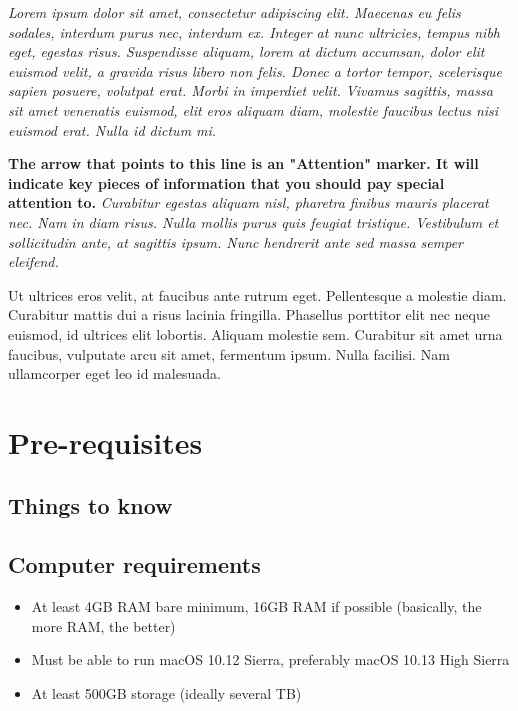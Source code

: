 \textit{Lorem ipsum dolor sit amet, consectetur adipiscing elit. Maecenas eu felis sodales, interdum purus nec, interdum ex. Integer at nunc  ultricies, tempus nibh eget, egestas risus. Suspendisse aliquam, lorem at dictum accumsan, dolor elit euismod velit, a gravida risus libero non felis. Donec a tortor tempor, scelerisque sapien posuere, volutpat erat. Morbi in imperdiet velit. Vivamus sagittis, massa sit amet venenatis euismod, elit eros aliquam diam, molestie faucibus lectus nisi euismod erat. Nulla id dictum mi.}

\attention \textbf{The arrow that points to this line is an "Attention" marker. It will indicate key pieces of information that you should pay special attention to.} \textit{Curabitur egestas aliquam nisl, pharetra finibus mauris placerat nec. Nam in diam risus. Nulla mollis purus quis feugiat tristique. Vestibulum et sollicitudin ante, at sagittis ipsum. Nunc hendrerit ante sed massa semper eleifend.}

 Ut ultrices eros velit, at faucibus ante rutrum eget. Pellentesque a molestie diam. Curabitur mattis dui a risus lacinia fringilla. Phasellus porttitor elit nec neque euismod, id ultrices elit lobortis. Aliquam molestie sem. Curabitur sit amet urna faucibus, vulputate arcu sit amet, fermentum ipsum. Nulla facilisi. Nam ullamcorper eget leo id malesuada.

\section{Pre-requisites}
\subsection*{Things to know}
\subsection*{Computer requirements}
\begin{itemize}
    \item At least 4GB RAM bare minimum, 16GB RAM if possible (basically, the more RAM, the better)
    \item Must be able to run macOS 10.12 Sierra, preferably macOS 10.13 High Sierra
    \item At least 500GB storage (ideally several TB)
\end{itemize}

